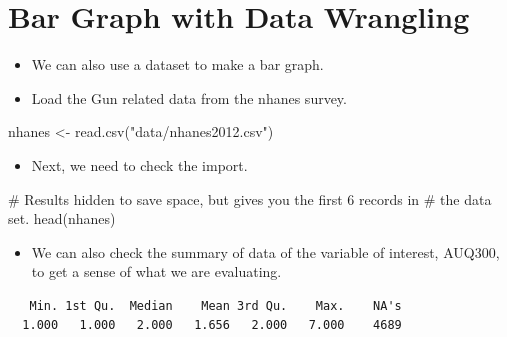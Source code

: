\documentclass[
  letterpaper,
  DIV=11,
  numbers=noendperiod]{scrreprt}
\newenvironment{Shaded}{\begin{snugshade}}{\end{snugshade}}
\newcommand{\CommentTok}[1]{\textcolor[rgb]{0.37,0.37,0.37}{#1}}
\newcommand{\FunctionTok}[1]{\textcolor[rgb]{0.28,0.35,0.67}{#1}}
\newcommand{\NormalTok}[1]{\textcolor[rgb]{0.00,0.23,0.31}{#1}}
\newcommand{\OtherTok}[1]{\textcolor[rgb]{0.00,0.23,0.31}{#1}}
\newcommand{\SpecialCharTok}[1]{\textcolor[rgb]{0.37,0.37,0.37}{#1}}
\newcommand{\StringTok}[1]{\textcolor[rgb]{0.13,0.47,0.30}{#1}}
\providecommand{\tightlist}{%
  \setlength{\itemsep}{0pt}\setlength{\parskip}{0pt}}\usepackage{longtable,booktabs,array}
\begin{document}
\section{Bar Graph with Data
Wrangling}\label{bar-graph-with-data-wrangling}

\begin{itemize}
\tightlist
\item
  We can also use a dataset to make a bar graph.\\
\item
  Load the Gun related data from the nhanes survey.
\end{itemize}

\begin{Shaded}
\begin{Highlighting}[]
\NormalTok{nhanes }\OtherTok{\textless{}{-}} \FunctionTok{read.csv}\NormalTok{(}\StringTok{"data/nhanes2012.csv"}\NormalTok{)}
\end{Highlighting}
\end{Shaded}

\begin{itemize}
\tightlist
\item
  Next, we need to check the import.
\end{itemize}

\begin{Shaded}
\begin{Highlighting}[]
\CommentTok{\# Results hidden to save space, but gives you the first 6 records in}
\CommentTok{\# the data set.}
\FunctionTok{head}\NormalTok{(nhanes)}
\end{Highlighting}
\end{Shaded}

\begin{itemize}
\tightlist
\item
  We can also check the summary of data of the variable of interest,
  AUQ300, to get a sense of what we are evaluating.
\end{itemize}

\begin{Shaded}
\end{Shaded}

\begin{verbatim}
   Min. 1st Qu.  Median    Mean 3rd Qu.    Max.    NA's 
  1.000   1.000   2.000   1.656   2.000   7.000    4689 
\end{verbatim}
\end{document}
